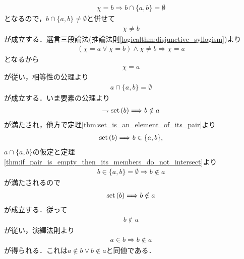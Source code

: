 \begin{prf}
\begin{description}
\begin{align}
					\chi = b \Longrightarrow b \cap \{a,b\} = \emptyset
				\end{align}
				となるので，$b \cap \{a,b\} \neq \emptyset$と併せて
				\begin{align}
					\chi \neq b
				\end{align}
				が成立する．選言三段論法(推論法則\ref{logicalthm:disjunctive_syllogism})より
				\begin{align}
					(\chi = a \vee \chi = b) \wedge \chi \neq b \Longrightarrow \chi = a
				\end{align}
				となるから
				\begin{align}
					\chi = a
				\end{align}
				が従い，相等性の公理より
				\begin{align}
					a \cap \{a,b\} = \emptyset
				\end{align}
				が成立する．いま要素の公理より
				\begin{align}
					\rightharpoondown \operatorname*{set}\hspace{0.15em}(b) \Longrightarrow b \notin a
				\end{align}
				が満たされ，他方で定理\ref{thm:set_is_an_element_of_its_pair}より
				\begin{align}
					\operatorname*{set}\hspace{0.15em}(b) \Longrightarrow b \in \{a,b\},
				\end{align}
				$a \cap \{a,b\}$の仮定と定理\ref{thm:if_pair_is_empty_then_its_members_do_not_intersect}より
				\begin{align}
					b \in \{a,b\} = \emptyset \Longrightarrow b \notin a
				\end{align}
				が満たされるので
				\begin{align}
					\operatorname*{set}\hspace{0.15em}(b) \Longrightarrow b \notin a
				\end{align}
				が成立する．従って
				\begin{align}
					b \notin a
				\end{align}
				が従い，演繹法則より
				\begin{align}
					a \in b \Longrightarrow b \notin a
				\end{align}
				が得られる．これは$a \notin b \vee b \notin a$と同値である．
				

\end{description}
\end{prf}
